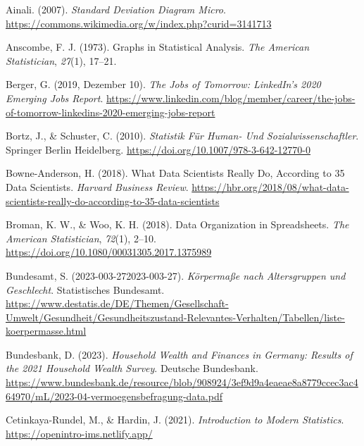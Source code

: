 \documentclass[
  a4paper,
]{scrbook}
\newlength{\cslhangindent}
\newenvironment{CSLReferences}[2] %
 {\begin{list}{}{%
  \setlength{\itemindent}{0pt}
  \setlength{\leftmargin}{0pt}
  \setlength{\parsep}{0pt}
  \ifodd #1
   \setlength{\leftmargin}{\cslhangindent}
   \setlength{\itemindent}{-1\cslhangindent}
  \fi
  \setlength{\itemsep}{#2\baselineskip}}}
 {\end{list}}
\theoremstyle{definition}
\theoremstyle{definition}
\theoremstyle{definition}
\theoremstyle{remark}
\begin{document}
\label{refs}
\begin{CSLReferences}{1}{0}
Ainali. (2007). \emph{Standard Deviation Diagram Micro}.
\url{https://commons.wikimedia.org/w/index.php?curid=3141713}

Anscombe, F. J. (1973). Graphs in Statistical Analysis. \emph{The
American Statistician}, \emph{27}(1), 17--21.

Berger, G. (2019, Dezember 10). \emph{The {Jobs} of {Tomorrow}:
{LinkedIn}'s 2020 {Emerging Jobs Report}}.
\url{https://www.linkedin.com/blog/member/career/the-jobs-of-tomorrow-linkedins-2020-emerging-jobs-report}

Bortz, J., \& Schuster, C. (2010). \emph{Statistik Für {Human-} Und
{Sozialwissenschaftler}}. Springer Berlin Heidelberg.
\url{https://doi.org/10.1007/978-3-642-12770-0}

Bowne-Anderson, H. (2018). What {Data Scientists Really Do}, {According}
to 35 {Data Scientists}. \emph{Harvard Business Review}.
\url{https://hbr.org/2018/08/what-data-scientists-really-do-according-to-35-data-scientists}

Broman, K. W., \& Woo, K. H. (2018). Data {Organization} in
{Spreadsheets}. \emph{The American Statistician}, \emph{72}(1), 2--10.
\url{https://doi.org/10.1080/00031305.2017.1375989}

Bundesamt, S. (2023-003-272023-003-27). \emph{Körpermaße nach
Altersgruppen und Geschlecht}. Statistisches Bundesamt.
\url{https://www.destatis.de/DE/Themen/Gesellschaft-Umwelt/Gesundheit/Gesundheitszustand-Relevantes-Verhalten/Tabellen/liste-koerpermasse.html}

Bundesbank, D. (2023). \emph{Household Wealth and Finances in {Germany}:
{Results} of the 2021 Household Wealth Survey}. Deutsche Bundesbank.
\url{https://www.bundesbank.de/resource/blob/908924/3ef9d9a4eaeae8a8779ccec3ac464970/mL/2023-04-vermoegensbefragung-data.pdf}

Cetinkaya-Rundel, M., \& Hardin, J. (2021). \emph{Introduction to
{Modern Statistics}}. \url{https://openintro-ims.netlify.app/}


\end{CSLReferences}
\end{document}
